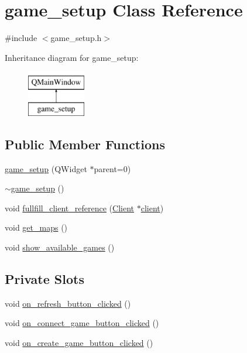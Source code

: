 \hypertarget{classgame__setup}{\section{game\-\_\-setup Class Reference}
\label{classgame__setup}
}


{\ttfamily \#include $<$game\-\_\-setup.\-h$>$}

Inheritance diagram for game\-\_\-setup\-:\begin{figure}[H]
\begin{center}
\leavevmode
\includegraphics[height=2.000000cm]{classgame__setup}
\end{center}
\end{figure}
\subsection*{Public Member Functions}
\begin{DoxyCompactItemize}
\item 
\hyperlink{classgame__setup_a61492ef3b55322be81a48f6221f527fc}{game\-\_\-setup} (Q\-Widget $\ast$parent=0)
\item 
\hyperlink{classgame__setup_a56511d975fd81988a48b97474eb0b83d}{$\sim$game\-\_\-setup} ()
\item 
void \hyperlink{classgame__setup_ad64efad58a39368041cf58fe401f0e6e}{fullfill\-\_\-client\-\_\-reference} (\hyperlink{classClient}{Client} $\ast$\hyperlink{classgame__setup_adbd0161cc227afe2a8a11c018ee5f139}{client})
\item 
void \hyperlink{classgame__setup_a4bea8d768e958cbc35fa05511ddde8d2}{get\-\_\-maps} ()
\item 
void \hyperlink{classgame__setup_af46808237a6e3b32cef7416c1d210e75}{show\-\_\-available\-\_\-games} ()
\end{DoxyCompactItemize}
\subsection*{Private Slots}
\begin{DoxyCompactItemize}
\item 
void \hyperlink{classgame__setup_a8ff53bb08d7eb073a9cf8cd63f3901e1}{on\-\_\-refresh\-\_\-button\-\_\-clicked} ()
\item 
void \hyperlink{classgame__setup_a620ff00085288b53a1b7cb1a81946b41}{on\-\_\-connect\-\_\-game\-\_\-button\-\_\-clicked} ()
\item 
void \hyperlink{classgame__setup_a02df644221f3577c06cdf4179c99b361}{on\-\_\-create\-\_\-game\-\_\-button\-\_\-clicked} ()
\end{DoxyCompactItemize}
